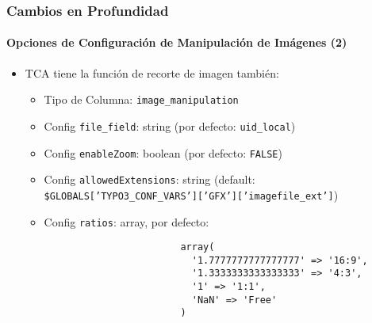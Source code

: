 \begin{frame}[fragile]
	\frametitle{Cambios en Profundidad}
	\framesubtitle{Opciones de Configuración de Manipulación de Imágenes (2)}

	\lstset{basicstyle=\smaller\ttfamily}

	\begin{itemize}
		\item TCA tiene la función de recorte de imagen también:

			\begin{itemize}
				\item Tipo de Columna: \texttt{image\_manipulation}
				\item Config \texttt{file\_field}: string	\tabto{5.6cm}(por defecto: \texttt{uid\_local})
				\item Config \texttt{enableZoom}: boolean	\tabto{5.6cm}(por defecto: \texttt{FALSE})
				\item Config \texttt{allowedExtensions}: string\newline
					(default: \smaller\texttt{\$GLOBALS['TYPO3\_CONF\_VARS']['GFX']['imagefile\_ext']}\small)
				\item Config \texttt{ratios}: array, por defecto:

					\begin{lstlisting}
						array(
						  '1.7777777777777777' => '16:9',
						  '1.3333333333333333' => '4:3',
						  '1' => '1:1',
						  'NaN' => 'Free'
						)
					\end{lstlisting}
			\end{itemize}

	\end{itemize}

\end{frame}

